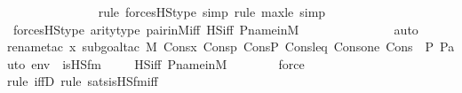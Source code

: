\begin{isabellebody}
\ \ \ \ \ \ \ \ \ \ \ \ \ \ \isamarkupfalse%
{\isacharparenleft}{\kern0pt}rule\ forcesHS{\isacharprime}{\kern0pt}{\isacharunderscore}{\kern0pt}type{\isacharcomma}{\kern0pt}\ simp{\isacharcomma}{\kern0pt}\ rule\ max{\isacharunderscore}{\kern0pt}le{}{\isacharcomma}{\kern0pt}\ simp{\isacharparenright}{\kern0pt}\isanewline
\ \ \isamarkupfalse%
\ forcesHS{\isacharprime}{\kern0pt}{\isacharunderscore}{\kern0pt}type\ arity{\isacharunderscore}{\kern0pt}type\ pair{\isacharunderscore}{\kern0pt}in{\isacharunderscore}{\kern0pt}M{\isacharunderscore}{\kern0pt}iff\ HS{\isacharunderscore}{\kern0pt}iff\ P{\isacharunderscore}{\kern0pt}name{\isacharunderscore}{\kern0pt}in{\isacharunderscore}{\kern0pt}M\isanewline
\ \ \ \ \ \ \ \ \ \ \ \ \ \isamarkupfalse%
\ auto{\isacharbrackleft}{\kern0pt}{}{\isacharbrackright}{\kern0pt}\isanewline
\ \ \ \ \isamarkupfalse%
{\isacharparenleft}{\kern0pt}rename{\isacharunderscore}{\kern0pt}tac\ x{\isacharcomma}{\kern0pt}\ subgoal{\isacharunderscore}{\kern0pt}tac\ {\isachardoublequoteopen}M{\isacharcomma}{\kern0pt}\ Cons{\isacharparenleft}{\kern0pt}x{\isacharcomma}{\kern0pt}\ Cons{\isacharparenleft}{\kern0pt}p{\isacharcomma}{\kern0pt}\ Cons{\isacharparenleft}{\kern0pt}P{\isacharcomma}{\kern0pt}\ Cons{\isacharparenleft}{\kern0pt}leq{\isacharcomma}{\kern0pt}\ Cons{\isacharparenleft}{\kern0pt}one{\isacharcomma}{\kern0pt}\ Cons{\isacharparenleft}{\kern0pt}{\isasymlangle}{\isasymF}{\isacharcomma}{\kern0pt}\ {\isasymG}{\isacharcomma}{\kern0pt}\ P{\isacharcomma}{\kern0pt}\ P{\isacharunderscore}{\kern0pt}auto{\isasymrangle}{\isacharcomma}{\kern0pt}\ env{\isacharparenright}{\kern0pt}{\isacharparenright}{\kern0pt}{\isacharparenright}{\kern0pt}{\isacharparenright}{\kern0pt}{\isacharparenright}{\kern0pt}{\isacharparenright}{\kern0pt}\ {\isasymTurnstile}\ is{\isacharunderscore}{\kern0pt}HS{\isacharunderscore}{\kern0pt}fm{\isacharparenleft}{\kern0pt}{}{\isacharcomma}{\kern0pt}\ {}{\isacharparenright}{\kern0pt}{\isachardoublequoteclose}{\isacharparenright}{\kern0pt}\isanewline
\ \ \isamarkupfalse%
\ HS{\isacharunderscore}{\kern0pt}iff\ P{\isacharunderscore}{\kern0pt}name{\isacharunderscore}{\kern0pt}in{\isacharunderscore}{\kern0pt}M\ \isanewline
\ \ \ \ \ \isamarkupfalse%
\ force\ \ \isanewline
\ \ \ \ \isamarkupfalse%
{\isacharparenleft}{\kern0pt}rule\ iffD{}{\isacharcomma}{\kern0pt}\ rule\ sats{\isacharunderscore}{\kern0pt}is{\isacharunderscore}{\kern0pt}HS{\isacharunderscore}{\kern0pt}fm{\isacharunderscore}{\kern0pt}iff{\isacharparenright}{\kern0pt}\isanewline

\end{isabellebody}
